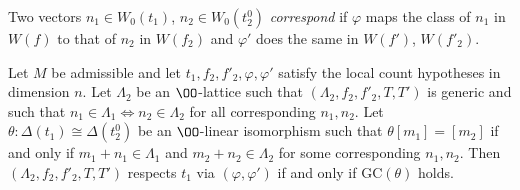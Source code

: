 Two vectors $n_1\in W_0(t_1)$, $n_2\in W_0(t_2^0)$ \emph{correspond} if $\varphi$ maps the class of $n_1$ in $W(f)$ to that of $n_2$ in $W(f_2)$
and $\varphi'$ does the same in $W(f')$, $W(f'_2)$.

\begin{proposition}\label{pf:thmS-leaves:prop:claimR}
Let $M$ be admissible and let $t_1,f_2,f'_2,\varphi,\varphi'$ satisfy the local count hypotheses in dimension $n$. Let $\Lambda_2$ be an
$\OO$-lattice such that $(\Lambda_2,f_2,f'_2,T,T')$ is generic and such that $n_1\in\Lambda_1\iff n_2\in\Lambda_2$ for all corresponding
$n_1,n_2$. Let $\theta:\Delta(t_1)\cong\Delta(t_2^0)$ be an $\OO$-linear isomorphism such that $\theta[m_1]=[m_2]$ if and only if $m_1+n_1\in\Lambda_1$ and
$m_2+n_2\in\Lambda_2$ for some corresponding $n_1,n_2$. Then $(\Lambda_2,f_2,f'_2,T,T')$ respects $t_1$ via $(\varphi,\varphi')$ if and only if
$\mathrm{GC}(\theta)$ holds.
\end{proposition}

